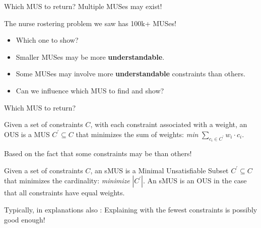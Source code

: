 \documentclass{cons-beamer}
\begin{document}
\begin{frame}{Which MUS to return?}
  Multiple MUSes may exist! 

  The nurse rostering problem we saw has 100k+ MUSes!
  \begin{itemize}
    \item Which one to show?
    \item Smaller MUSes may be more \textbf{understandable}.
    \item Some MUSes may involve more \textbf{understandable} constraints than others.
    \item Can we influence which MUS to find and show?
  \end{itemize}
\end{frame}

\begin{frame}{Which MUS to return?}
  \begin{definition}
    Given a set of constraints $C$, with each constraint associated with a weight, an OUS is a MUS $C^{\prime} \subseteq C$ that minimizes the sum of weights: \textit{min} $\sum_{c_i \in C^{\prime}} w_i \cdot c_i$.
  \end{definition}

  Based on the fact that some constraints may be  than others!
  \vfill

  \begin{definition}
    Given a set of constraints $C$, an sMUS is a Minimal Unsatisfiable Subset $C^{\prime} \subseteq C$ that minimizes the cardinality: \textit{minimize} $|C^{\prime}|$. An sMUS is an OUS in the case that all constraints have equal weights.
  \end{definition}

  Typically, in explanations also : Explaining with the fewest constraints is possibly good enough!
\end{frame}
\end{document}
